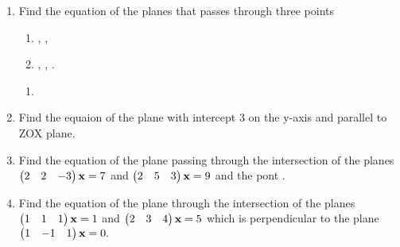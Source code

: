 \documentclass[journal,12pt,twocolumn]{IEEEtran}
\renewcommand\thesection{\arabic{section}}
\begin{document}
\begin{enumerate}[label=\thesection.\arabic*.,ref=\thesection.\theenumi]
%
\item Find the equation of the planes that passes through three points
\begin{enumerate}
\item {}, , 
\item {}, , .
\end{enumerate}
\solution
\begin{enumerate}
    \item 
%
\end{enumerate}
\item Find the equaion of the plane with intercept 3 on the y-axis and parallel to ZOX plane.
\\
\solution
%
\item Find the equation of the plane passing through the intersection of the planes 
$
\begin{pmatrix}2 & 2 & -3\end{pmatrix}\mathbf{x}=7
$
 and 
$
\begin{pmatrix}2 & 5 & 3\end{pmatrix}\mathbf{x}=9
$
and the pont .
%
\\
\solution
%
\item  Find the equation of the plane through the intersection of the planes
$
\begin{pmatrix}1 & 1 & 1\end{pmatrix}\mathbf{x}=1
$
 and 
$
\begin{pmatrix}2 & 3 & 4\end{pmatrix}\mathbf{x}=5
$
which is perpendicular to the plane 
$
\begin{pmatrix}1 & -1 & 1\end{pmatrix}\mathbf{x}=0.
$
%
\\
\solution
%


\end{enumerate}
\end{document}
